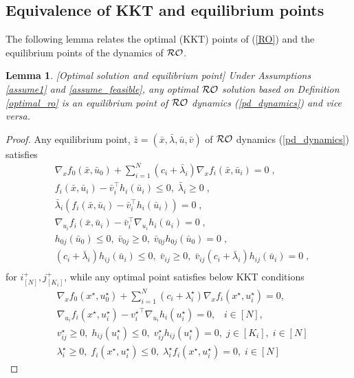 \documentclass[journal,twoside,web]{ieeecolor}
\newtheorem{lemma}{Lemma}
\begin{document}
\subsection{Equivalence of KKT and equilibrium points} \label{kkt<=>eq.sec}
 The following lemma relates the optimal (KKT) points of (\ref{RO}) and the equilibrium points of the dynamics of ${\cal RO}$.
\begin{lemma}\label{kkttoeq.lem}[Optimal solution and equilibrium point]
Under Assumptions \ref{assume1} and \ref{assume_feasible}, any optimal ${\cal RO}$ solution based on Definition \ref{optimal_ro} is an equilibrium point of ${\cal RO}$ dynamics (\ref{pd_dynamics}) and vice versa.
\end{lemma}
\begin{proof}
Any equilibrium point, $\bar{z}=(\bar{x},\bar{\lambda},\bar{u},\bar{v})$  of ${\cal RO}$ dynamics (\ref{pd_dynamics}) satisfies
\begin{align*}
&\nabla_x f_0(\bar x,\bar{u}_0)+  \sum_{i=1}^N (c_i+\bar \lambda_i) \nabla_x f_i(\bar x,\bar u_i)=0\;,\\
&f_{i}(\bar x,\bar u_i)-\bar v_i^\top h_i(\bar u_i)\leq 0,\;\bar \lambda_i\geq 0\;,\\
&\bar \lambda_i(f_{i}(\bar x,\bar u_i)-\bar v_i^\top h_i(\bar u_i))=0\;,\\
&\nabla_{u_i} f_i(\bar x,\bar u_i)-\bar v_i^\top \nabla_{u_i} h_i(\bar u_i)=0\;,\\
&h_{0j}(\bar u_0)\leq 0,\; \bar v_{0j}\geq 0,\;\bar v_{0j}h_{0j}(\bar u_0)=0\;,\\
& (c_i+\bar{\lambda}_i) h_{ij}(\bar u_i)\leq 0,\; \bar v_{ij}\geq 0,\;\bar v_{ij}(c_i+\bar \lambda_i) h_{ij}(\bar u_i)=0\;,\\
\end{align*}
for $i^+_{[N]},j^+_{[K_i]}$, while any optimal point satisfies below KKT conditions
\begin{align}
    &\nabla_x f_0(x^\star,u_0^\star)+  \sum_{i=1}^N(c_i+\lambda^\star_i) \nabla_x f_i(x^\star,u_i^\star)=0, \label{kkt1} \\
    &\nabla_{u_i} f_i(x^\star,u_i^\star)-{v_i^\star}^\top \nabla_{u_i} h_i(u_i^\star)=0, \;\;\; i \in [N], \label{kkt2} \\
    &v_{ij}^\star\geq 0,\; h_{ij}(u_i^\star)\leq 0,\;v_{ij}^\star h_{ij}(u_i^\star)=0, \; j \in [K_i], \; i \in [N] \label{kkt3} \\
    &\lambda_i^\star\geq 0,\;f_{i}(x^\star,u_i^\star)\leq 0,\;\lambda_i^\star f_{i}(x^\star,u_i^\star)=0, \; i \in [N] \label{kkt4}
\end{align}


\end{proof}
\end{document}
